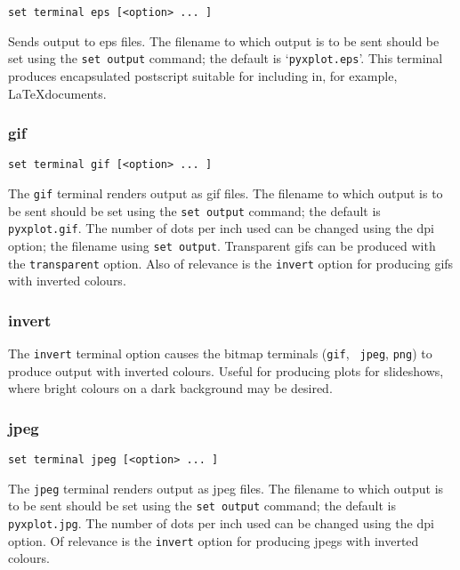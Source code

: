 \begin{verbatim}
set terminal eps [<option> ... ]
\end{verbatim}

Sends output to eps files.  The filename to which output is to be sent should be
set using the {\tt set output} command; the default is `\texttt{pyxplot.eps}'.  This
terminal produces encapsulated postscript suitable for including in, for
example, \LaTeX documents.


\subsubsection{gif}

\begin{verbatim}
set terminal gif [<option> ... ]
\end{verbatim}

The {\tt gif} terminal renders output as gif files. The filename to which output
is to be sent should be set using the {\tt set output} command; the default is
{\tt pyxplot.gif}. The number of dots per inch used can be changed using the dpi
option; the filename using {\tt set output}. Transparent gifs can be produced
with the {\tt transparent} option. Also of relevance is the {\tt invert} option
for producing gifs with inverted colours.


\subsubsection{invert}

The {\tt invert} terminal option causes the bitmap terminals ({\tt gif}, {\tt
jpeg}, {\tt png}) to produce output with inverted colours. Useful for producing
plots for slideshows, where bright colours on a dark background may be desired.


\subsubsection{jpeg}

\begin{verbatim}
set terminal jpeg [<option> ... ]
\end{verbatim}

The {\tt jpeg} terminal renders output as jpeg files. The filename to which
output is to be sent should be set using the {\tt set output} command; the
default is {\tt pyxplot.jpg}.  The number of dots per inch used can be changed
using the dpi option. Of relevance is the {\tt invert} option for producing
jpegs with inverted colours.

